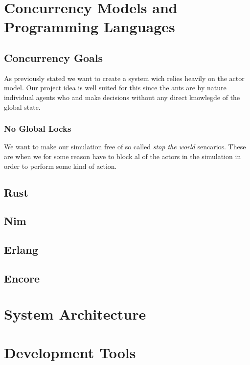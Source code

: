 \documentclass[a4paper]{article}
\begin{document}
\section{Concurrency Models and Programming Languages}
\subsection{Concurrency Goals}
As previously stated we want to create a system wich relies heavily on the actor model. Our project idea
is well suited for this since the ants are by nature individual agents who and make decisions without any direct knowlegde
of the global state.
\subsubsection{No Global Locks}
We want to make our simulation free of so called \emph{stop the world}
sencarios. These are when we for some reason have to block al of the actors in
the simulation in order to perform some kind of action.


\subsection{Rust}

\subsection{Nim}

\subsection{Erlang}

\subsection{Encore}

\section{System Architecture}

\section{Development Tools}
\end{document}
